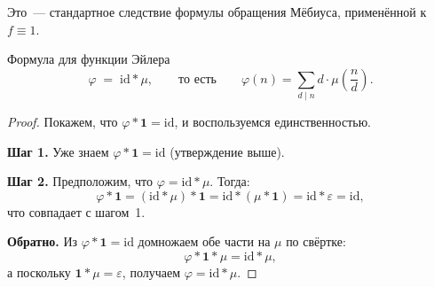 Это~--- стандартное следствие формулы обращения Мёбиуса, применённой к $f \equiv 1$.

\begin{Theorem}{Формула для функции Эйлера}{}
	\[
	\varphi \;=\; \mathrm{id} * \mu,
	\qquad\text{то есть}\qquad
	\varphi(n) = \sum_{d \mid n} d\cdot\mu\!\left(\frac{n}{d}\right).
	\]
\end{Theorem}

\begin{proof}
	Покажем, что $\varphi * \mathbf{1} = \mathrm{id}$, и воспользуемся единственностью.
	
	\textbf{Шаг 1.} Уже знаем $\varphi * \mathbf{1} = \mathrm{id}$ (утверждение выше).
	
	\textbf{Шаг 2.} Предположим, что $\varphi = \mathrm{id} * \mu$. Тогда:
	\[
	\varphi * \mathbf{1}
	= (\mathrm{id} * \mu) * \mathbf{1}
	= \mathrm{id} * (\mu * \mathbf{1})
	= \mathrm{id} * \varepsilon
	= \mathrm{id},
	\]
	что совпадает с шагом~1.\;\checkmark
	
	\textbf{Обратно.} Из $\varphi * \mathbf{1} = \mathrm{id}$ домножаем обе части
	на $\mu$ по свёртке:
	\[
	\varphi * \mathbf{1} * \mu
	= \mathrm{id} * \mu,
	\]
	а поскольку $\mathbf{1} * \mu = \varepsilon$, получаем $\varphi = \mathrm{id} * \mu$.\;\checkmark
\end{proof}